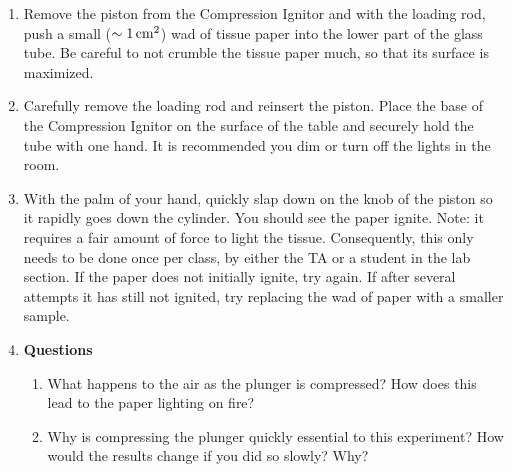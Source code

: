 \begin{enumerate}
	\item Remove the piston from the Compression Ignitor and with the loading rod, push a small ($\sim 1 \, {\rm cm}^{2}$) wad of tissue paper into the lower part of the glass tube.  Be careful to not crumble the tissue paper much, so that its surface is maximized.
	\item Carefully remove the loading rod and reinsert the piston.  Place the base of the Compression Ignitor on the surface of the table and securely hold the tube with one hand.  It is recommended you dim or turn off the lights in the room.
	\item With the palm of your hand, quickly slap down on the knob of the piston so it rapidly goes down the cylinder.  You should see the paper ignite.  Note: it requires a fair amount of force to light the tissue.  Consequently, this only needs to be done once per class, by either the TA or a student in the lab section.  If the paper does not initially ignite, try again.  If after several attempts it has still not ignited, try replacing the wad of paper with a smaller sample.
	\item \textbf{Questions}
	\begin{enumerate}
		\item What happens to the air as the plunger is compressed?  How does this lead to the paper lighting on fire?
		\item Why is compressing the plunger quickly essential to this experiment?  How would the results change if you did so slowly?  Why?
	\end{enumerate}
\end{enumerate}
